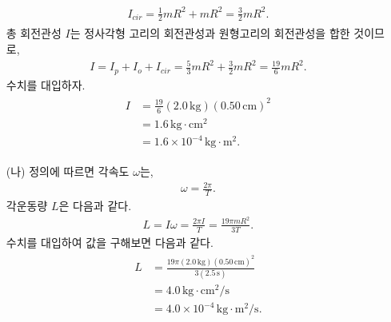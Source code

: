\documentclass[floatfix,nofootinbib,superscriptaddress,fleqn]{revtex4-2}
\begin{document}
\begin{itemize}
  \begin{align}
    \begin{split}
      I_{cir} = \frac{1}{2}mR^2+mR^2 = \frac{3}{2}mR^2.
    \end{split}
  \end{align}
  총 회전관성 $I$는 정사각형 고리의 회전관성과 원형고리의 회전관성을 합한 것이므로,
  \begin{align}
    I = I_p+I_o+I_{cir} = \frac{5}{3}mR^2+\frac{3}{2}mR^2=\frac{19}{6}mR^2.
  \end{align}
  수치를 대입하자.
  \begin{align}
    \begin{split}
      I&=\frac{19}{6}(2.0\,\mathrm{kg})(0.50\,\mathrm{cm})^2  \\
      &= 1.6\,\mathrm{kg\cdot cm^2} \\
      &= 1.6\times 10^{-4}\,\mathrm{kg\cdot m^2} .
    \end{split}
  \end{align}
  \item[(나)] 
  정의에 따르면 각속도 $\omega$는,
  \begin{align}
    \omega = \frac{2\pi}{T}.
  \end{align}
  각운동량 $L$은 다음과 같다.
  \begin{align}
    L = I\omega = \frac{2\pi I}{T} = \frac{19\pi mR^2}{3T}.
  \end{align}
  수치를 대입하여 값을 구해보면 다음과 같다.
  \begin{align}
    \begin{split}
      L &=\frac{19\pi (2.0\,\mathrm{kg})(0.50\,\mathrm{cm})^2}
      {3(2.5\,\mathrm{s})}  \\
      &= 4.0\,\mathrm{kg\cdot cm^2/s} \\
      &= 4.0\times 10^{-4}\,\mathrm{kg\cdot m^2/s}.
    \end{split}
  \end{align}
  \end{itemize}

\vspace{1.cm}
\end{document}
